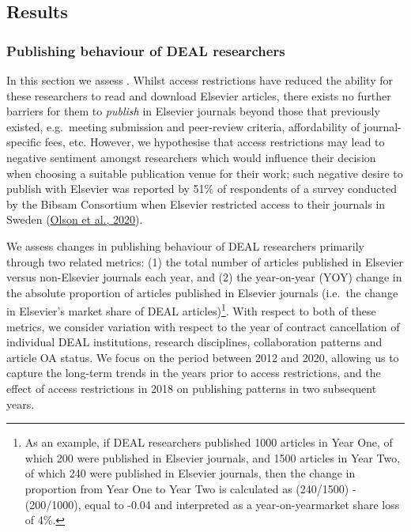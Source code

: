 \documentclass[
]{article}
\begin{document}
\hypertarget{results}{%
\subsection{Results}\label{results}}

\hypertarget{publishing-behaviour-of-deal-researchers}{%
\subsubsection{Publishing behaviour of DEAL researchers}\label{publishing-behaviour-of-deal-researchers}}

In this section we assess . Whilst access restrictions have reduced the ability for these researchers to read and download Elsevier articles, there exists no further barriers for them to \emph{publish} in Elsevier journals beyond those that previously existed, e.g.~meeting submission and peer-review criteria, affordability of journal-specific fees, etc. However, we hypothesise that access restrictions may lead to negative sentiment amongst researchers which would influence their decision when choosing a suitable publication venue for their work; such negative desire to publish with Elsevier was reported by 51\% of respondents of a survey conducted by the Bibsam Consortium when Elsevier restricted access to their journals in Sweden (\href{http://doi.org/10.1629/uksg.507}{Olson et al., 2020}).

We assess changes in publishing behaviour of DEAL researchers primarily through two related metrics: (1) the total number of articles published in Elsevier versus non-Elsevier journals each year, and (2) the year-on-year (YOY) change in the absolute proportion of articles published in Elsevier journals (i.e.~the change in Elsevier's market share of DEAL articles)\footnote{As an example, if DEAL researchers published 1000 articles in Year One, of which 200 were published in Elsevier journals, and 1500 articles in Year Two, of which 240 were published in Elsevier journals, then the change in proportion from Year One to Year Two is calculated as (240/1500) - (200/1000), equal to -0.04 and interpreted as a year-on-yearmarket share loss of 4\%.}. With respect to both of these metrics, we consider variation with respect to the year of contract cancellation of individual DEAL institutions, research disciplines, collaboration patterns and article OA status. We focus on the period between 2012 and 2020, allowing us to capture the long-term trends in the years prior to access restrictions, and the effect of access restrictions in 2018 on publishing patterns in two subsequent years.
\end{document}
